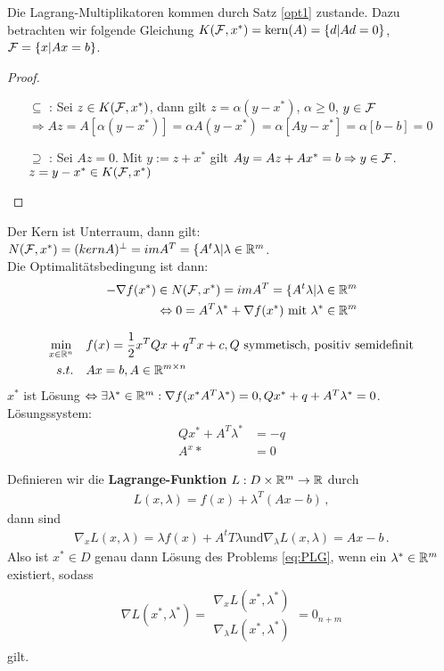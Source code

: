 \begin{Lemma}
Die Lagrang-Multiplikatoren kommen durch Satz \ref{opt1} zustande. Dazu betrachten wir folgende Gleichung $K(\mathcal{F},x^*)=\text{kern}(A)=\lbrace d|Ad=0\rbrace$, $\mathcal{F}=\lbrace x|Ax=b\rbrace$.
\end{Lemma}
\begin{proof}
\begin{itemize}
\item[$\subseteq$ :]Sei $z\in K(\mathcal{F},x^*)$, dann gilt $z=\alpha(y-x^*)$, $\alpha\geq 0$, $y\in\mathcal{F}$
$\Rightarrow Az=A[\alpha(y-x^*)]=\alpha A(y-x^*)=\alpha[Ay-x^*]=\alpha[b-b]=0$
\item[$\supseteq$ :] Sei $Az=0$. Mit $y:=z+x^*$ gilt $Ay=Az+Ax^*=b \Rightarrow y\in\mathcal{F}$.
$z=y-x^*\in K(\mathcal{F},x^*)$
\end{itemize}
\end{proof}
Der Kern ist Unterraum, dann gilt: $N(\mathcal{F},x^*)=(kern A)^\perp=im A^T=\lbrace A^t\lambda|\lambda\in\mathbb R^m$.\\
Die Optimalitätsbedingung ist dann:
\begin{align*}
-\nabla f(x^*)\in N(\mathcal{F},x^*)=im A^T=\lbrace A^t\lambda|\lambda\in\mathbb R^m \\
\Leftrightarrow 0=A^T \lambda^*+\nabla f(x^*) \text{ mit } \lambda^*\in\mathbb R^m
\end{align*}

\begin{Beispiel} 
  	\begin{align}
   		\min_{x\in\mathbb R^n}
   		& & & f(x)=\frac{1}{2}x^TQx+q^Tx+c, Q\text{ symmetisch, positiv semidefinit} \\
   		s.t. &&& Ax=b, A\in\mathbb R^{m\times n}
  	\end{align}
$x^*$ ist Lösung $\Leftrightarrow \exists \lambda^*\in\mathbb R^m: \nabla f(x^*A^T\lambda^*)=0, Qx^*+q+A^T\lambda^*=0$.
Lösungssystem:
\begin{align*}
Qx^*+A^T\lambda^*&=-q \\
A^x*&=0
\end{align*}

\end{Beispiel} 

Definieren wir die \textbf{Lagrange-Funktion} $L: D \times \mathbb R^m \rightarrow \mathbb R$ durch
\begin{align*}
L(x, \lambda) = f(x) + \lambda^T (Ax - b) \,,
\end{align*}
dann sind
\begin{align*}
\nabla_x L(x, \lambda) = \lambda f(x) + A^tT \lambda \text{und} \nabla_\lambda L(x, \lambda) = Ax - b\,.
\end{align*}
Also ist $x^* \in D$ genau dann Lösung des Problems \eqref{eq:PLG}, wenn ein $\lambda^* \in \mathbb R^m$ existiert, sodass
\begin{align*}
\nabla L(x^* , \lambda ^*) = \begin{matrix}
\nabla_x L(x^*, \lambda ^* )\\
\nabla_\lambda L(x^*, \lambda^* )
\end{matrix}
= 0_{n+m}
\end{align*}
gilt.

